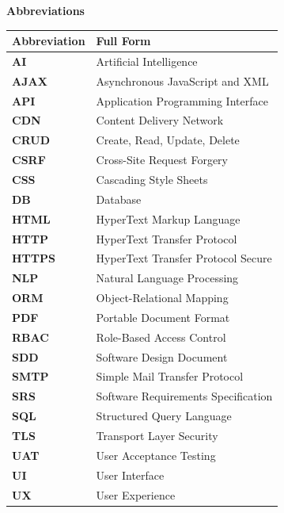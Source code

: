 
\newpage
\thispagestyle{plain}

\begin{center}
\textbf{\LARGE Abbreviations}
\end{center}

\vspace{1cm}

{%
\centering
\renewcommand{\arraystretch}{1.4}
\begin{tabularx}{\textwidth}{|p{3cm}|X|}
\hline
\textbf{Abbreviation} & \textbf{Full Form} \\
\hline
\textbf{AI} & Artificial Intelligence \\ \hline
\textbf{AJAX} & Asynchronous JavaScript and XML \\ \hline
\textbf{API} & Application Programming Interface \\ \hline
\textbf{CDN} & Content Delivery Network \\ \hline
\textbf{CRUD} & Create, Read, Update, Delete \\ \hline
\textbf{CSRF} & Cross-Site Request Forgery \\ \hline
\textbf{CSS} & Cascading Style Sheets \\ \hline
\textbf{DB} & Database \\ \hline
\textbf{HTML} & HyperText Markup Language \\ \hline
\textbf{HTTP} & HyperText Transfer Protocol \\ \hline
\textbf{HTTPS} & HyperText Transfer Protocol Secure \\ \hline
\textbf{NLP} & Natural Language Processing \\ \hline
\textbf{ORM} & Object-Relational Mapping \\ \hline
\textbf{PDF} & Portable Document Format \\ \hline
\textbf{RBAC} & Role-Based Access Control \\ \hline
\textbf{SDD} & Software Design Document \\ \hline
\textbf{SMTP} & Simple Mail Transfer Protocol \\ \hline
\textbf{SRS} & Software Requirements Specification \\ \hline
\textbf{SQL} & Structured Query Language \\ \hline
\textbf{TLS} & Transport Layer Security \\ \hline
\textbf{UAT} & User Acceptance Testing \\ \hline
\textbf{UI} & User Interface \\ \hline
\textbf{UX} & User Experience \\ \hline
\end{tabularx}
}%
